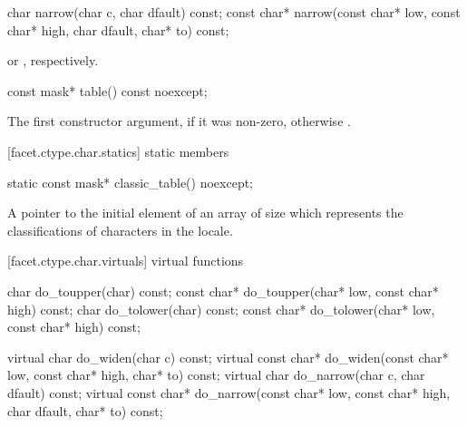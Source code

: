 %
\begin{itemdecl}
char        narrow(char c, char dfault) const;
const char* narrow(const char* low, const char* high,
                   char dfault, char* to) const;
\end{itemdecl}

\begin{itemdescr}
\pnum
\returns
{}%
or
%
,
respectively.
\end{itemdescr}

%
\begin{itemdecl}
const mask* table() const noexcept;
\end{itemdecl}

\begin{itemdescr}
\pnum
\returns
The first constructor argument, if it was non-zero, otherwise
.
\end{itemdescr}

[facet.ctype.char.statics]{ static members}

%
\begin{itemdecl}
static const mask* classic_table() noexcept;
\end{itemdecl}

\begin{itemdescr}
\pnum
\returns
A pointer to the initial element of an array of size
which represents the classifications of characters in the  locale.
\end{itemdescr}

[facet.ctype.char.virtuals]{ virtual functions}

%
%
%
%
\begin{codeblock}
char        do_toupper(char) const;
const char* do_toupper(char* low, const char* high) const;
char        do_tolower(char) const;
const char* do_tolower(char* low, const char* high) const;

virtual char        do_widen(char c) const;
virtual const char* do_widen(const char* low,
                             const char* high,
                             char* to) const;
virtual char        do_narrow(char c, char dfault) const;
virtual const char* do_narrow(const char* low,
                              const char* high,
                              char dfault, char* to) const;
\end{codeblock}

